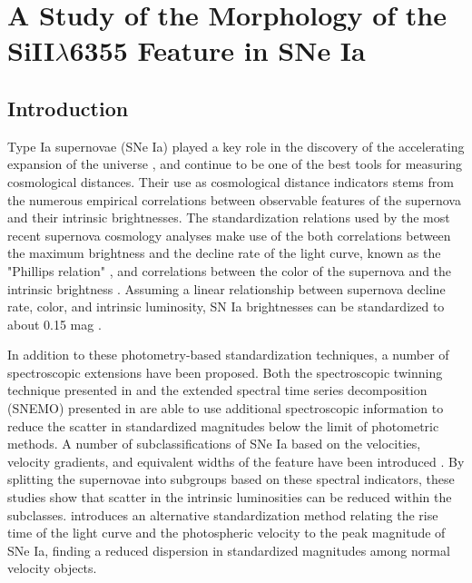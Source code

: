 \chapter{A Study of the Morphology of the SiII$\lambda$6355 Feature in SNe Ia}

\section{Introduction}
\label{intro}
Type Ia supernovae (SNe Ia) played a key role in the discovery of the accelerating expansion of the universe \citep{perlmutter_measurements_1999, riess_observational_1998}, and continue to be one of the best tools for measuring cosmological distances. Their use as cosmological distance indicators stems from the numerous empirical correlations between observable features of the supernova and their intrinsic brightnesses. The standardization relations used by the most recent supernova cosmology analyses make use of the both correlations between the maximum brightness and the decline rate of the light curve, known as the "Phillips relation" \citep{phillips_absolute_1993}, and correlations between the color of the supernova and the intrinsic brightness \citep{riess_mlcs_1996, tripp_twoparameter_1998, guy_salt:_2005, guy_salt2:_2007}. Assuming a linear relationship between supernova decline rate, color, and intrinsic luminosity, SN Ia brightnesses can be standardized to about 0.15 mag \citep{betoule_improved_2014}.

In addition to these photometry-based standardization techniques, a number of spectroscopic extensions have been proposed. Both the spectroscopic twinning technique presented in \cite{fakhouri_improving_2015} and the extended spectral time series decomposition (SNEMO) presented in \cite{saunders_improved_2018} are able to use additional spectroscopic information to reduce the scatter in standardized magnitudes below the limit of photometric methods. A number of subclassifications of SNe Ia based on the velocities, velocity gradients, and equivalent widths of the \siliconii feature have been introduced \citep{branch_comparative_2006, benetti_diversity_2005, wang_improved_2009, wang_evidence_2013}. By splitting the supernovae into subgroups based on these spectral indicators, these studies show that scatter in the intrinsic luminosities can be reduced within the subclasses. \cite{zheng_empirical_2018} introduces an alternative standardization method relating the rise time of the light curve and the photospheric velocity to the peak magnitude of SNe Ia, finding a reduced dispersion in standardized magnitudes among normal velocity objects.

